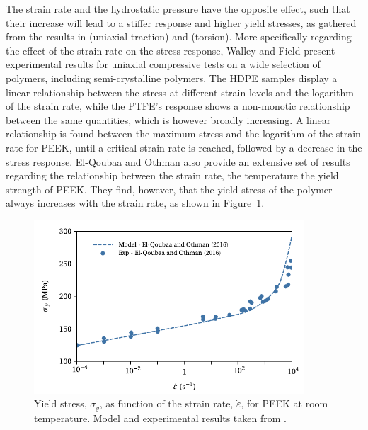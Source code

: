 
The strain rate and the hydrostatic pressure have the opposite effect, such that their increase will lead to a stiffer response and higher yield stresses, as gathered from the results in \cite{popelarViscoelasticMaterialCharacterization1990} (uniaxial traction) and \cite{trussEffectHydrostaticPressure1981} (torsion).
More specifically regarding the effect of the strain rate on the stress response, Walley and Field \citep{walleyStrainRateSensitivity1994} present experimental results for uniaxial compressive tests on a wide selection of polymers, including semi-crystalline polymers.
The HDPE samples display a linear relationship between the stress at different strain levels and the logarithm of the strain rate, while the PTFE's response shows a non-monotic relationship between the same quantities, which is however broadly increasing.
A linear relationship is found between the maximum stress and the logarithm of the strain rate for PEEK, until a critical strain rate is reached, followed by a decrease in the stress response.
El-Qoubaa and Othman \citep{el-qoubaaStrainRateSensitivity2016} also provide an extensive set of results regarding the relationship between the strain rate, the temperature the yield strength of PEEK.
They find, however, that the yield stress of the polymer always increases with the strain rate, as shown in Figure~\ref{fig:yield_el_qoubaa_peek}.
\begin{figure}[hbtp]
    \centering
    \includegraphics[width=0.9\textwidth]{figures/yield_el_qoubaa_peek}
    \caption{Yield stress, $\sigma_y$, as function of the strain rate, $\dot \varepsilon$, for PEEK at room temperature. Model and experimental results taken from \cite{el-qoubaaStrainRateSensitivity2016}.}
\label{fig:yield_el_qoubaa_peek}
\end{figure}


